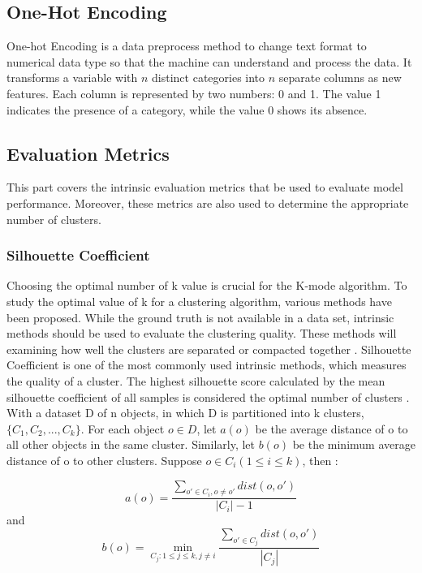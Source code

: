 \documentclass[12pt]{article}
\begin{document}
\subsection{One-Hot Encoding}\label{one-hot-enc}
One-hot Encoding is a data preprocess method to change text format to numerical data type so that the machine can understand and process the data. It transforms a variable with $n$ distinct categories into $n$ separate columns as new features. Each column is represented by two numbers: 0 and 1. The value 1 indicates the presence of a category, while the value 0 shows its absence.\citep{thuy2020optimize}

\subsection{Evaluation Metrics} \label{evaluation metrics}
This part covers the intrinsic evaluation metrics that be used to evaluate model performance. Moreover, these metrics are also used to determine the appropriate number of clusters.

\subsubsection{Silhouette Coefficient}

\noindent Choosing the optimal number of k value is crucial for the 
K-mode algorithm. To study the optimal value of k for a clustering algorithm, 
various methods have been proposed. While the ground truth is not available
in a data set, intrinsic methods should be used to evaluate the 
clustering quality. These methods will examining how well the clusters
are separated or compacted together \citep{2012vi}. Silhouette Coefficient is one of the most
commonly used intrinsic methods, which measures the quality of a cluster. The highest
silhouette score calculated by the mean silhouette coefficient of all samples
is considered the optimal number of clusters \citep{9260048}. \\

\noindent With a dataset D of n objects, in which D is partitioned into 
k clusters, $\{C_1,C_2,...,C_k\}$. For each object $o \in D$, 
let $a(o)$ be the average distance of o to all other objects in the same cluster.
Similarly, let $b(o)$ be the minimum average distance of o to other clusters.
Suppose $o \in C_i(1 \leq i \leq k )$, then \citep{2012vi}: 

$$a(o) = \frac{\sum_{o' \in C_i , o \neq o'} dist(o,o')}{|C_i| - 1}$$
and
$$b(o) = \min_{C_j: 1 \leq j \leq k, j \neq i} \frac{\sum_{o' \in C_j} dist(o,o')}{|C_j|}$$
\end{document}

